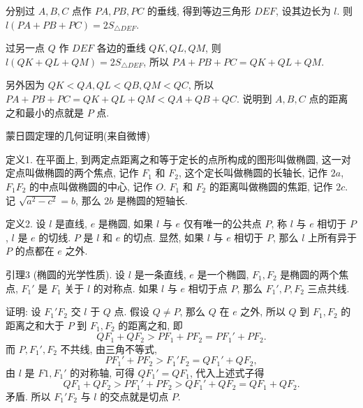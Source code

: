 分别过 $A,B,C$ 点作 $PA, PB, PC$ 的垂线, 得到等边三角形 $DEF$, 设其边长为 $l$. 则 $l(PA+PB+PC) = 2S_{\triangle DEF}$.

过另一点 $Q$ 作 $DEF$ 各边的垂线 $QK, QL, QM$, 则$l(QK+QL+QM) = 2S_{\triangle DEF}$, 所以 $PA+PB+PC = QK+QL+QM$.

另外因为 $QK < QA, QL < QB, QM < QC $, 所以 $PA+PB+PC = QK+QL+QM < QA+QB+QC$. 说明到 $A,B,C$ 点的距离之和最小的点就是 $P$ 点.


\newpage

\noindent 蒙日圆定理的几何证明(来自微博)

定义1. 在平面上, 到两定点距离之和等于定长的点所构成的图形叫做椭圆, 这一对定点叫做椭圆的两个焦点, 记作 $F_1$ 和 $F_2$, 这个定长叫做椭圆的长轴长, 记作 $2a$, $F_1F_2$ 的中点叫做椭圆的中心, 记作 $O$. $F_1$ 和 $F_2$ 的距离叫做椭圆的焦距, 记作 $2c$. 记 $\sqrt{a^2-c^2}=b$, 那么 $2b$ 是椭圆的短轴长.

定义2. 设 $l$ 是直线, $e$ 是椭圆, 如果 $l$ 与 $e$ 仅有唯一的公共点 $P$, 称 $l$ 与 $e$ 相切于 $P$, $l$ 是 $e$ 的切线. $P$ 是 $l$ 和 $e$ 的切点. 显然, 如果 $l$ 与 $e$ 相切于 $P$, 那么 $l$ 上所有异于 $P$ 的点都在 $e$ 之外.
\begin{figure*}[htbp]
\centering
{}
\end{figure*}

引理3 (椭圆的光学性质). 设 $l$ 是一条直线, $e$ 是一个椭圆, $F_1, F_2$ 是椭圆的两个焦点, $F_1'$ 是 $F_1$ 关于 $l$ 的对称点. 如果 $l$ 与 $e$ 相切于点 $P$, 那么 $F_1',P,F_2$ 三点共线.

证明: 设 $F_1'F_2$ 交 $l$ 于 $Q$ 点. 假设 $Q\neq P$, 那么 $Q$ 在 $e$ 之外, 所以 $Q$ 到 $F_1, F_2$ 的距离之和大于 $P$ 到 $F_1, F_2$ 的距离之和, 即 
$$QF_1 + QF_2 > PF_1 + PF_2 = PF_1'+PF_2 .$$
而 $P,F_1', F_2$ 不共线, 由三角不等式, 
$$PF_1'+PF_2 > F_1'F_2 = QF_1'+QF_2,$$
由 $l$ 是 $F1, F_1'$ 的对称轴, 可得 $QF_1'=QF_1$, 代入上述式子得
$$QF_1 + QF_2 > PF_1'+PF_2 > QF_1'+QF_2 = QF_1+QF_2.$$ 
矛盾. 所以 $F_1'F_2$ 与 $l$ 的交点就是切点 $P$.

